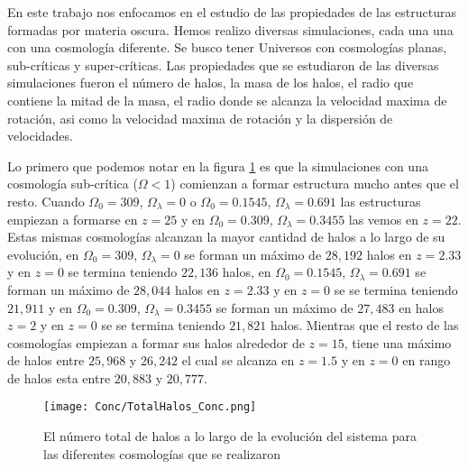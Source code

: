 \renewcommand{\altname}{Conclusiones}
\lhead[\fancyplain{}{}]%
      {\fancyplain{}{\bfseries \altname}}
\addchap{\altname}
En este trabajo nos enfocamos en el estudio de las propiedades de las estructuras formadas por materia oscura. Hemos realizo diversas simulaciones, cada una una con una cosmología diferente. Se busco tener Universos con cosmologías planas, sub-críticas y super-críticas. Las propiedades que se estudiaron de las diversas simulaciones fueron el número de halos, la masa de los halos, el radio que contiene la mitad de la masa, el radio donde se alcanza la velocidad maxima de rotación, asi como la velocidad maxima de rotación y la dispersión de velocidades.

Lo primero que podemos notar en la figura \ref{fig:Conc_TotalHalos} es que la simulaciones con una cosmología sub-crítica ($\Omega < 1$) comienzan a formar estructura mucho antes que el resto. Cuando $\Omega_0 = 309$, $\Omega_\lambda=0$ o $\Omega_0=0.1545$, $\Omega_\lambda=0.691$ las estructuras empiezan a formarse en $z=25$ y en $\Omega_0=0.309$, $\Omega_\lambda=0.3455$ las vemos en $z=22$. Estas mismas cosmologías alcanzan la mayor cantidad de halos a lo largo de su evolución, en $\Omega_0 = 309$, $\Omega_\lambda=0$ se forman un máximo de $28,192$ halos en $z=2.33$ y en $z=0$ se termina teniendo $22,136$ halos, en $\Omega_0 = 0.1545$, $\Omega_\lambda=0.691$ se forman un máximo de $28,044$ halos en $z=2.33$ y en $z=0$ se se termina teniendo $21,911$ y en $\Omega_0 = 0.309$, $\Omega_\lambda=0.3455$ se forman un máximo de $27,483$ en halos $z=2$ y en $z=0$ se se termina teniendo $21,821$ halos. Mientras que el resto de las cosmologías empiezan a formar sus halos alrededor de $z=15$, tiene una máximo de halos entre $25,968$ y $26,242$ el cual se alcanza en $z=1.5$ y en $z=0$ en rango de halos esta entre $20,883$ y $20,777$.

\begin{figure}[H]
      \centering
      \texttt{[image: Conc/TotalHalos\_Conc.png]}
      \caption[Evolución del total de halos para todas las cosmologías]{El número total de halos a lo largo de la evolución del sistema para las diferentes cosmologías que se realizaron}
      \label{fig:Conc_TotalHalos}
\end{figure}

